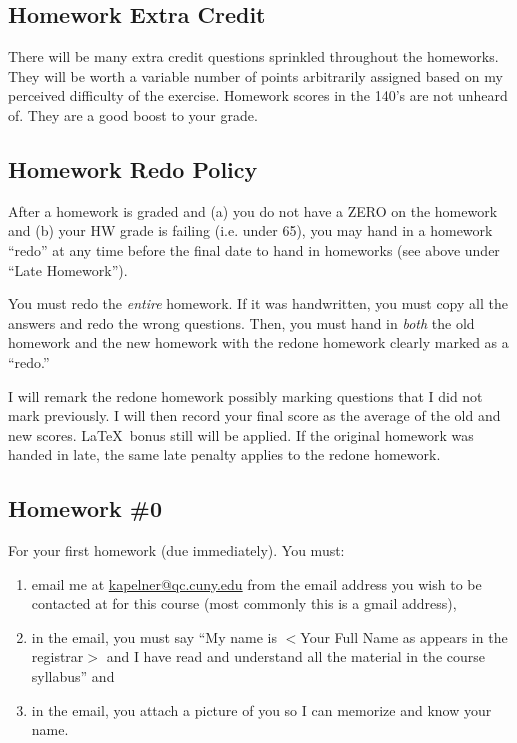 \documentclass[12pt]{article}
\newcommand{\qu}[1]{``#1''}
\begin{document}
\subsection*{Homework Extra Credit}

There will be many extra credit questions sprinkled throughout the homeworks. They will be worth a variable number of points arbitrarily assigned based on my perceived difficulty of the exercise. Homework scores in the 140's are not unheard of. They are a good boost to your grade.

\subsection*{Homework Redo Policy}

After a homework is graded and (a) you do not have a ZERO on the homework and (b) your HW grade is failing (i.e. under 65), you may hand in a homework \qu{redo} at any time before the final date to hand in homeworks (see above under \qu{Late Homework}). 

You must redo the \textit{entire} homework. If it was handwritten, you must copy all the answers and redo the wrong questions. Then, you must hand in \textit{both} the old homework and the new homework with the redone homework clearly marked as a \qu{redo.}

I will remark the redone homework possibly marking questions that I did not mark previously. I will then record your final score as the average of the old and new scores. \LaTeX~bonus still will be applied. If the original homework was handed in late, the same late penalty applies to the redone homework.

\subsection*{Homework \#0}

For your first homework (due immediately). You must:

\begin{enumerate}[(1)]
\item email me at \href{kapelner@qc.cuny.edu}{kapelner@qc.cuny.edu} from the email address you wish to be contacted at for this course (most commonly this is a gmail address),
\item in the email, you must say \qu{My name is $<$Your Full Name as appears in the registrar$>$ and I have read and understand all the material in the course syllabus} and
\item in the email, you attach a picture of you so I can memorize and know your name.
\end{enumerate}
\end{document}

